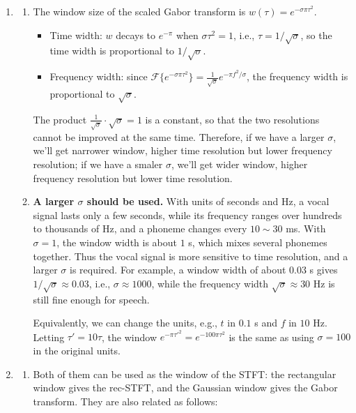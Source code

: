 \documentclass[12pt,a4paper]{article}
\begin{document}
\begin{enumerate}
\item
  \begin{enumerate}[label=(\alph*)]
    \item The window size of the scaled Gabor transform is $w(\tau)=e^{-\sigma\pi\tau^2}$.
    \begin{itemize}
      \item Time width: $w$ decays to $e^{-\pi}$ when $\sigma\tau^2=1$, i.e., $\tau=1/\sqrt{\sigma}$, so the time width is proportional to $1/\sqrt{\sigma}$.
      \item Frequency width: since $\mathcal{F}\{e^{-\sigma\pi\tau^2}\}=\frac{1}{\sqrt{\sigma}}e^{-\pi f^2/\sigma}$, the frequency width is proportional to $\sqrt{\sigma}$.
    \end{itemize}
    The product $\frac{1}{\sqrt{\sigma}}\cdot\sqrt{\sigma}=1$ is a constant, so that the two resolutions cannot be improved at the same time. Therefore, if we have a larger $\sigma$, we'll get narrower window, higher time resolution but lower frequency resolution; if we have a smaler $\sigma$, we'll get wider window, higher frequency resolution but lower time resolution.

    \item \textbf{A larger $\sigma$ should be used.} With units of seconds and Hz, a vocal signal lasts only a few seconds, while its frequency ranges over hundreds to thousands of Hz, and a phoneme changes every $10\sim30$ ms. With $\sigma=1$, the window width is about $1$ s, which mixes several phonemes together. Thus the vocal signal is more sensitive to time resolution, and a larger $\sigma$ is required. For example, a window width of about $0.03$ s gives $1/\sqrt{\sigma}\approx0.03$, i.e., $\sigma\approx1000$, while the frequency width $\sqrt{\sigma}\approx30$ Hz is still fine enough for speech.

    Equivalently, we can change the units, e.g., $t$ in $0.1$ s and $f$ in $10$ Hz. Letting $\tau'=10\tau$, the window $e^{-\pi\tau'^2}=e^{-100\pi\tau^2}$ is the same as using $\sigma=100$ in the original units.
  \end{enumerate}



\item
  \begin{enumerate}[label=(\alph*)]
    \item Both of them can be used as the window of the STFT: the rectangular window gives the rec-STFT, and the Gaussian window gives the Gabor transform. They are also related as follows:
    

\end{enumerate}
\end{enumerate}
\end{document}
